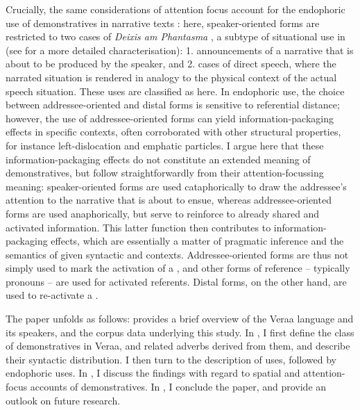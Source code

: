 \documentclass[output=paper
,modfonts
,nonflat]{langsci/langscibook}
\begin{document}
Crucially, the same considerations of attention focus account for the endophoric use of demonstratives in narrative texts \citep[476]{Diessel2006}: here, speaker-oriented forms are restricted to two cases of \textit{Deixis am Phantasma} \citep[121--140]{Buehler1934}, a subtype of situational use in \cite[222]{Himmelmann1996}  (see  for a more detailed characterisation): 1. announcements of a narrative that is about to be produced by the speaker, and 2. cases of direct speech, where the narrated situation is rendered in analogy to the physical context of the actual speech situation. These uses are classified as  here. In endophoric use, the choice between addressee-oriented and distal forms is sensitive to referential distance; however, the use of addressee-oriented forms can yield information-packaging effects in specific  contexts, often corroborated with other structural properties, for instance left-dislocation and emphatic particles. I argue here that these information-packaging effects do not constitute an extended meaning of demonstratives, but follow straightforwardly from their attention-focussing meaning: speaker-oriented forms are used cataphorically to draw the addressee's attention to the narrative that is about to ensue, whereas addressee-oriented forms are used anaphorically, but serve to reinforce  to already shared and activated information. This latter function then contributes to information-packaging effects, which are essentially a matter of pragmatic inference and the semantics of given syntactic and  contexts. Addressee-oriented forms are thus not simply used to mark the activation of a , and other forms of reference -- typically pronouns -- are used for activated referents. Distal forms, on the other hand, are used to re-activate a .

The paper unfolds as follows:  provides a brief overview of the Vera{\textquotesingle}a language and its speakers, and the corpus data underlying this study. In , I first define the class of demonstratives in Vera{\textquotesingle}a, and related  adverbs derived from them, and describe their syntactic distribution. I then turn to the description of  uses, followed by endophoric uses. In , I discuss the findings with regard to spatial and attention-focus accounts of demonstratives. In , I conclude the paper, and provide an outlook on future research.
\end{document}
